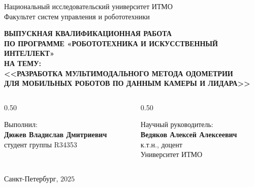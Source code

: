 \documentclass{beamer} %
\begin{document}
\begin{frame}
  \begin{center}\tiny
    Национальный исследовательский университет ИТМО\\
    Факультет систем управления и робототехники
  \end{center}


  \begin{center}\tiny
    \textbf{ВЫПУСКНАЯ КВАЛИФИКАЦИОННАЯ РАБОТА \\ ПО ПРОГРАММЕ «РОБОТОТЕХНИКА И ИСКУССТВЕННЫЙ ИНТЕЛЛЕКТ»}\\
    \vspace{0.2cm}
    \textbf{НА ТЕМУ:}\\
    \vspace{0.1cm}
    \textbf{<<РАЗРАБОТКА МУЛЬТИМОДАЛЬНОГО МЕТОДА ОДОМЕТРИИ \\ ДЛЯ МОБИЛЬНЫХ РОБОТОВ ПО ДАННЫМ КАМЕРЫ И ЛИДАРА>>}
  \end{center}

  \vspace{0.3cm}

  \begin{columns}
    \begin{column}{0.50\textwidth}
      \begin{center}\tiny
        Выполнил: \\
        \vspace{0.1cm}
        \textbf{Дюжев Владислав Дмитриевич}\\
        студент группы R34353 \\
      \end{center}
    \end{column}

    \begin{column}{0.50\textwidth}
      \begin{center}\tiny
        Научный руководитель:\\
        \vspace{0.1cm}
        \textbf{Ведяков Алексей Алексеевич} \\
        к.т.н., доцент\\
        Университет ИТМО \\
      \end{center}
    \end{column}
  \end{columns}

  \vspace{0.5cm}
  \begin{center}\tiny
    Санкт-Петербург, $2025$
  \end{center}
\end{frame}
\end{document}
